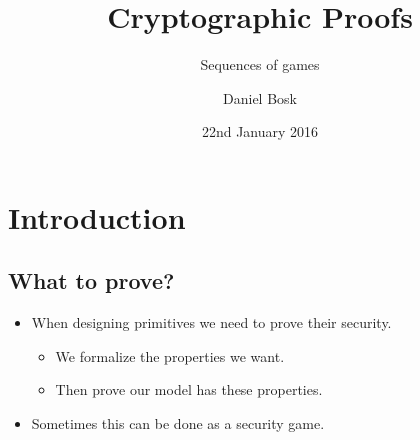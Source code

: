\title{Cryptographic Proofs}
\subtitle{%
  Sequences of games
}
\author[D. Bosk <dbosk@kth.se>]{Daniel Bosk}
\date{22nd January 2016}

\begin{frame}
  \maketitle
\end{frame}

\mode*

\begin{abstract}
  
\end{abstract}


\section{Introduction}

\subsection{What to prove?}

\begin{frame}
  \begin{itemize}

    \item When designing primitives we need to prove their security.
      \begin{itemize}
        \item We formalize the properties we want.
        \item Then prove our model has these properties.
      \end{itemize}

      \pause{}

    \item Sometimes this can be done as a security game.

  \end{itemize}
\end{frame}

